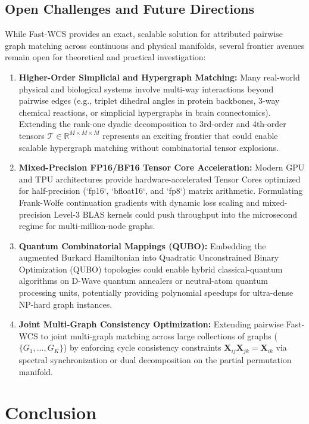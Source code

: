 \documentclass[a4paper,fleqn]{cas-dc}
\theoremstyle{thmstyleone}
\theoremstyle{thmstyletwo}
\theoremstyle{thmstylethree}
\begin{document}
\subsection{Open Challenges and Future Directions}
While Fast-WCS provides an exact, scalable solution for attributed pairwise graph matching across continuous and physical manifolds, several frontier avenues remain open for theoretical and practical investigation:
\begin{enumerate}
    \item \textbf{Higher-Order Simplicial and Hypergraph Matching:} Many real-world physical and biological systems involve multi-way interactions beyond pairwise edges (e.g., triplet dihedral angles in protein backbones, 3-way chemical reactions, or simplicial hypergraphs in brain connectomics). Extending the rank-one dyadic decomposition to 3rd-order and 4th-order tensors $\mathcal{T} \in \mathbb{R}^{M \times M \times M}$ represents an exciting frontier that could enable scalable hypergraph matching without combinatorial tensor explosions.
    \item \textbf{Mixed-Precision FP16/BF16 Tensor Core Acceleration:} Modern GPU and TPU architectures provide hardware-accelerated Tensor Cores optimized for half-precision (`fp16`, `bfloat16`, and `fp8`) matrix arithmetic. Formulating Frank-Wolfe continuation gradients with dynamic loss scaling and mixed-precision Level-3 BLAS kernels could push throughput into the microsecond regime for multi-million-node graphs.
    \item \textbf{Quantum Combinatorial Mappings (QUBO):} Embedding the augmented Burkard Hamiltonian into Quadratic Unconstrained Binary Optimization (QUBO) topologies could enable hybrid classical-quantum algorithms on D-Wave quantum annealers or neutral-atom quantum processing units, potentially providing polynomial speedups for ultra-dense NP-hard graph instances.
    \item \textbf{Joint Multi-Graph Consistency Optimization:} Extending pairwise Fast-WCS to joint multi-graph matching across large collections of graphs ($\{G_1, \dots, G_K\}$) by enforcing cycle consistency constraints $\mathbf{X}_{ij} \mathbf{X}_{jk} = \mathbf{X}_{ik}$ via spectral synchronization or dual decomposition on the partial permutation manifold.
\end{enumerate}

\section{Conclusion}
\label{sec:conclusion}
\end{document}
